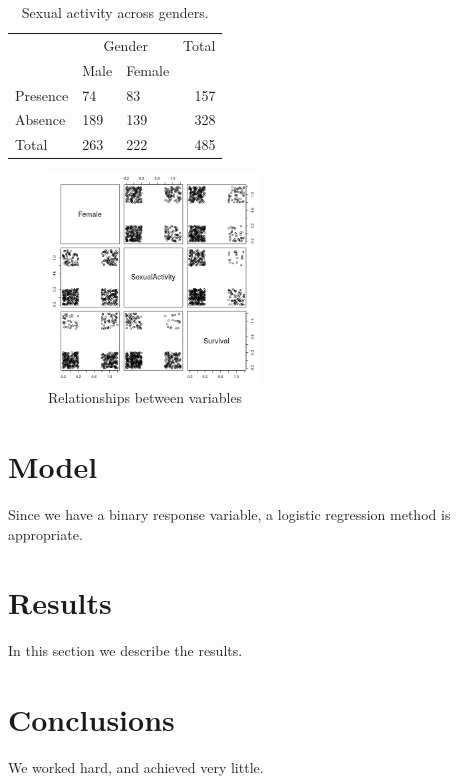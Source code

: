 \documentclass[12pt]{article}
\begin{document}
\begin{table}
    \centering
    \footnotesize
    \caption{Sexual activity across genders.}
    \label{tab:sexXgender}
    \begin{tabularx}{\textwidth}{X X X r}
        \toprule
        & \multicolumn{2}{c}{Gender} & Total \\
        \cmidrule{2-3}
        & Male & Female & \\
        \midrule 
        Presence & 74 & 83 & 157 \\
        Absence & 189 & 139 & 328\\  
        Total & 263 & 222& 485\\  
        \bottomrule
       \end{tabularx}
\end{table}



\begin{figure}[h]
    \caption{Relationships between variables}
    \centering
    \includegraphics[width=0.5\textwidth]{media/pairs.png}
    \end{figure}

\section{Model}
Since we have a binary response variable, a logistic regression method is appropriate.

\section{Results}\label{results}
In this section we describe the results.

\section{Conclusions}\label{conclusions}
We worked hard, and achieved very little.
\end{document}
